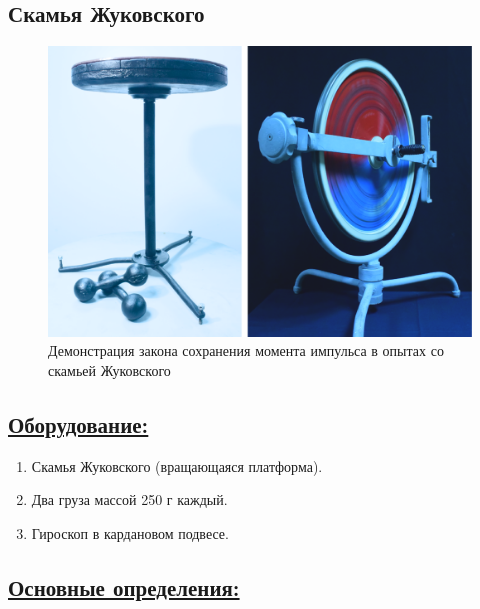 \documentclass[14pt,a4paper,oneside]{extarticle}	%
\begin{document}
	
	\newpage
	\begin{center}
		\subsection*{Скамья Жуковского}
	\end{center}
		
\begin{figure}[H] 	
	\centering 	
	\includegraphics[width=0.9\linewidth]{chair-1.png}
	\caption{Демонстрация закона сохранения момента импульса в опытах со скамьей Жуковского}
	\label{chair-1}
\end{figure}
	
	\subsection*{\underline{Оборудование:}}

			\begin{enumerate} 
			\item Скамья Жуковского (вращающаяся платформа).
			\item Два груза массой 250 г каждый.
			\item Гироскоп в кардановом подвесе.
		\end{enumerate}

\subsection*{\underline{Основные определения:}}
	
\end{document}
